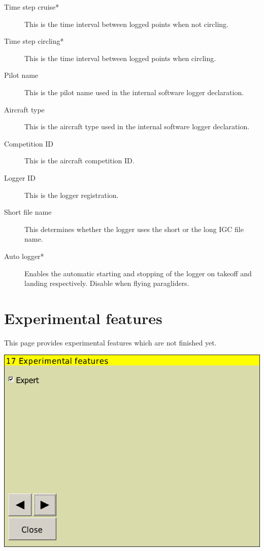 \documentclass[a4paper,12pt]{refrep}
\begin{document}
\begin{description}
\item[Time step cruise*]  This is the time interval between logged points when not circling. 
\item[Time step circling*]  This is the time interval between logged points when circling. 
\item[Pilot name]  This is the pilot name used in the internal software logger declaration.
\item[Aircraft type]  This is the aircraft type used in the internal software logger declaration.
\item[Competition ID]  This is the aircraft competition ID.
\item[Logger ID]  This is the logger registration.
\item[Short file name]  This determines whether the logger uses the short or the long IGC file name.
\item[Auto logger*]  Enables the automatic starting and stopping of the logger
on takeoff and landing respectively. Disable when flying paragliders.
\end{description}


\clearpage
\section{Experimental features}

This page provides experimental features which are not finished yet.

\begin{center}
\includegraphics[angle=0,width=\linewidth,keepaspectratio='true']{figures/config-exp.png}
\end{center}
\end{document}
